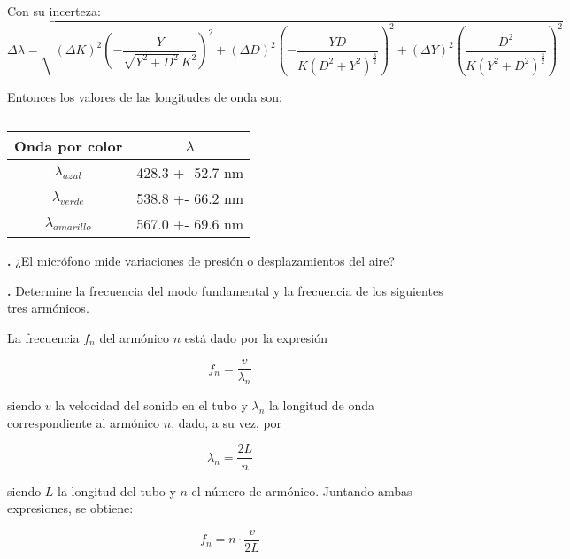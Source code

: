 \documentclass[12pt, a4paper]{article}
\newcounter{step}
\newcommand{\step}[1]
{
  \par\vspace{2ex}
  \stepcounter{step}
  \noindent\textbf{\arabic{step}.} #1\par\vspace{1ex}
}
\begin{document}
Con su incerteza:
\begin{equation}
  {\Delta}{\lambda} = \sqrt{({\Delta}K)^2(-\frac{Y}{\sqrt{Y^{2} + 
  D^{2}} \, K^{2}})^2 + ({\Delta}D)^2(-\frac{YD}{K \left(D^{2} + Y^{2}\right)^{\frac{3}{2}}})^2+ ({\Delta}Y)^2(\frac{D^{2}}{K \left(Y^{2} + D^{2}\right)^{\frac{3}{2}}})^2}
\label{equation5}
\end{equation}

Entonces los valores de las longitudes de onda son:
\begin{table}[H]
  \centering
  \begin{tabular}{|c|c|}
  \hline
  Onda por color & ${\lambda}$ \\
  \hline
  ${\lambda_{azul}}$  & 428.3 +- 52.7 nm  \\ \hline
  ${\lambda_{verde}}$  & 538.8 +- 66.2 nm \\ \hline
  ${\lambda_{amarillo}}$  & 567.0 +- 69.6 nm \\ \hline
  \end{tabular}
  \caption{\centering }
  \label{tabla2}
\end{table}











\step{¿El micrófono mide variaciones de presión o desplazamientos del aire?}



\step{Determine la frecuencia del modo fundamental y la frecuencia de los siguientes tres armónicos.}

La frecuencia $f_{n}$ del armónico $n$ está dado por la expresión

\begin{equation}
    f_{n} = \frac{v}{\lambda_{n}}
  \label{equation1}
\end{equation}

siendo $v$ la velocidad del sonido en el tubo y $\lambda_{n}$ la longitud de onda correspondiente al armónico $n$, dado, a su vez, por

\begin{equation}
  \lambda_{n} = \frac{2L}{n}
  \label{equation2}
\end{equation}

siendo $L$ la longitud del tubo y $n$ el número de armónico. Juntando ambas expresiones, se obtiene:

\begin{equation}
  f_{n} = n \cdot \frac{v}{2L}
  \label{equation3}
\end{equation}
\end{document}
